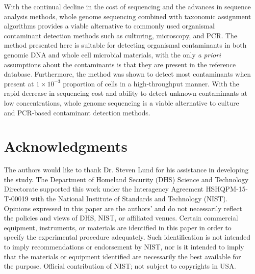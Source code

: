 \documentclass[fleqn,10pt,lineno]{wlpeerj}\usepackage[]{graphicx}\usepackage[]{color}
\begin{document}



With the continual decline in the cost of sequencing and the advances in sequence analysis methods, whole genome sequencing combined with taxonomic assignment algorithms provides a viable alternative to commonly used organismal contaminant detection methods such as culturing, microscopy, and PCR.
The method presented here is suitable for detecting organismal contaminants in both genomic DNA and whole cell microbial materials, with the only \textit{a priori} assumptions about the contaminants is that they are present in the reference database.
Furthermore, the method was shown to detect most contaminants when present at $1 \times 10^{-3}$ proportion of cells in a high-throughput manner.
With the rapid decrease in sequencing cost and ability to detect unknown contaminants at low concentrations, whole genome sequencing is a viable alternative to culture and PCR-based contaminant detection methods.

\newpage

\section*{Acknowledgments}

The authors would like to thank Dr. Steven Lund for his assistance in developing the study.
The Department of Homeland Security (DHS) Science and Technology Directorate supported this work under the Interagency Agreement HSHQPM-15-T-00019 with the National Institute of Standards and Technology (NIST).
Opinions expressed in this paper are the authors’ and do not necessarily reflect the policies and views of DHS,  NIST, or affiliated venues.
Certain commercial equipment, instruments, or materials are identified in this paper in order to specify the experimental procedure adequately.
Such identification is not intended to imply recommendations or endorsement by NIST,
nor is it intended to imply that the materials or equipment identified are necessarily the best available for the purpose.
Official contribution of NIST; not subject to copyrights in USA.


\end{document}
